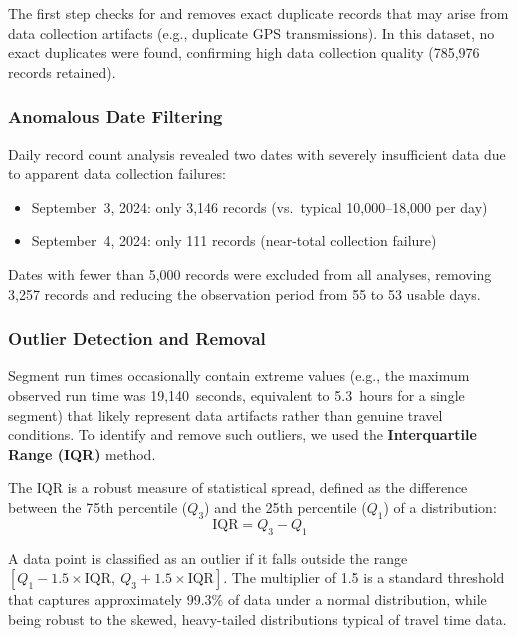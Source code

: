 The first step checks for and removes exact duplicate records that may arise from data collection artifacts (e.g., duplicate GPS transmissions). In this dataset, no exact duplicates were found, confirming high data collection quality (785,976 records retained).

\subsubsection{Anomalous Date Filtering}
\label{subsubsec:anomalous_dates}

Daily record count analysis revealed two dates with severely insufficient data due to apparent data collection failures:
\begin{itemize}
    \item September~3, 2024: only 3,146 records (vs.\ typical 10,000--18,000 per day)
    \item September~4, 2024: only 111 records (near-total collection failure)
\end{itemize}

Dates with fewer than 5,000 records were excluded from all analyses, removing 3,257 records and reducing the observation period from 55 to 53 usable days.

\subsubsection{Outlier Detection and Removal}
\label{subsubsec:outlier_removal}

Segment run times occasionally contain extreme values (e.g., the maximum observed run time was 19,140~seconds, equivalent to 5.3~hours for a single segment) that likely represent data artifacts rather than genuine travel conditions. To identify and remove such outliers, we used the \textbf{Interquartile Range (IQR)} method.

The IQR is a robust measure of statistical spread, defined as the difference between the 75th percentile ($Q_3$) and the 25th percentile ($Q_1$) of a distribution:
\begin{equation}
    \text{IQR} = Q_3 - Q_1
\end{equation}

A data point is classified as an outlier if it falls outside the range $[Q_1 - 1.5 \times \text{IQR},\ Q_3 + 1.5 \times \text{IQR}]$. The multiplier of 1.5 is a standard threshold that captures approximately 99.3\% of data under a normal distribution, while being robust to the skewed, heavy-tailed distributions typical of travel time data.


